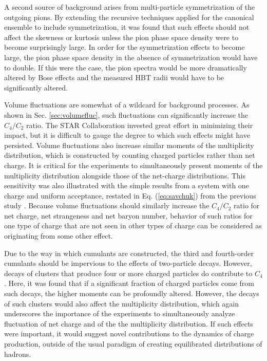 A second source of background arises from multi-particle symmetrization of the outgoing pions. By extending the recursive techniques applied for the canonical ensemble to include symmetrization, it was found that such effects should not affect the skewness or kurtosis unless the pion phase space density were to become surprisingly large. In order for the symmetrization effects to become large, the pion phase space density in the absence of symmetrization would have to double. If this were the case, the pion spectra would be more dramatically altered by Bose effects and the measured HBT radii would have to be significantly altered. 

Volume fluctuations are somewhat of a wildcard for background processes. As shown in Sec. \ref{sec:volumefluc}, such fluctuations can significantly increase the $C_4/C_2$ ratio. The STAR Collaboration invested great effort in minimizing their impact, but it is difficult to gauge the degree to which such effects might have persisted. Volume fluctuations also increase similar moments of the multiplicity distribution, which is constructed by counting charged particles rather than net charge. It is critical for the experiments to simultaneously present moments of the multiplicity distribution alongside those of the net-charge distributions. This sensitivity was also illustrated with the simple results from a system with one charge and uniform acceptance, restated in Eq. (\ref{eq:savchuk}) from the previous study \cite{Savchuk:2019xfg}. Because volume fluctuations should similarly increase the $C_4/C_2$ ratio for net charge, net strangeness and net baryon number, behavior of such ratios for one type of charge that are not seen in other types of charge can be considered as originating from some other effect. 

Due to the way in which cumulants are constructed, the third and fourth-order cumulants should be impervious to the effects of two-particle decays. However, decays of clusters that produce four or more charged particles do contribute to $C_4$. Here, it was found that if a significant fraction of charged particles come from such decays, the higher moments can be profoundly altered. However, the decays of such clusters would also affect the multiplicity distribution, which again underscores the importance of the experiments to simultaneously analyze fluctuation of net charge and of the the multiplicity distribution. If such effects were important, it would suggest novel contributions to the dynamics of charge production, outside of the usual paradigm of creating equilibrated distributions of hadrons. 

